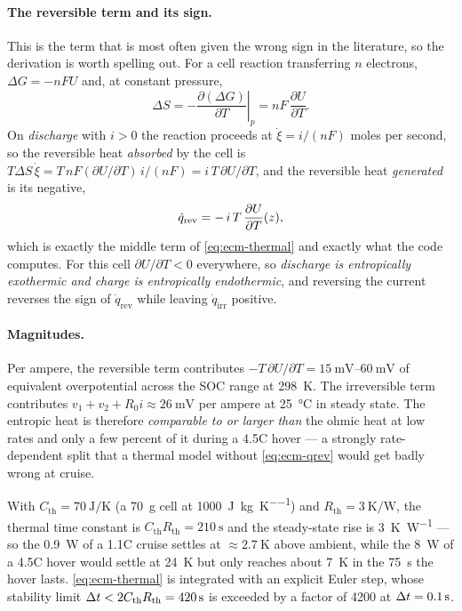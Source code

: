 \paragraph{The reversible term and its sign.} This is the term that is most often given the wrong
sign in the literature, so the derivation is worth spelling out. For a cell reaction transferring
$n$ electrons, $\Delta G = -nFU$ and, at constant pressure,
\begin{equation}
\Delta S = -\left.\frac{\partial(\Delta G)}{\partial T}\right|_p = nF\,\frac{\partial U}{\partial T}.
\label{eq:ecm-deltaS}
\end{equation}
On \emph{discharge} with $i>0$ the reaction proceeds at $\dot{\xi} = i/(nF)$ moles per second, so
the reversible heat \emph{absorbed} by the cell is
$T\Delta S\,\dot\xi = T\,nF(\partial U/\partial T)\,i/(nF) = i\,T\,\partial U/\partial T$, and the
reversible heat \emph{generated} is its negative,
\begin{equation}
\dot{q}_{\mathrm{rev}} = -\,i\,T\,\frac{\partial U}{\partial T}(z),
\label{eq:ecm-qrev}
\end{equation}
which is exactly the middle term of \eqref{eq:ecm-thermal} and exactly what the code computes.
For this cell $\partial U/\partial T<0$ everywhere, so \emph{discharge is entropically exothermic
and charge is entropically endothermic}, and reversing the current reverses the sign of
$\dot q_{\mathrm{rev}}$ while leaving $\dot q_{\mathrm{irr}}$ positive.

\paragraph{Magnitudes.} Per ampere, the reversible term contributes
$-T\,\partial U/\partial T = \SIrange{15}{60}{\milli\volt}$ of equivalent overpotential across the
SOC range at \SI{298}{\kelvin}. The irreversible term contributes
$v_1+v_2+R_0 i \approx \SI{26}{\milli\volt}$ per ampere at \SI{25}{\celsius} in steady state.
The entropic heat is therefore \emph{comparable to or larger than} the ohmic heat at low rates
and only a few percent of it during a 4.5C hover --- a strongly rate-dependent split that a
thermal model without \eqref{eq:ecm-qrev} would get badly wrong at cruise.

With $C_{\mathrm{th}} = \SI{70}{\joule\per\kelvin}$ (a \SI{70}{\gram} cell at
\SI{1000}{\joule\per\kilogram\per\kelvin}) and
$R_{\mathrm{th}} = \SI{3}{\kelvin\per\watt}$, the thermal time constant is
$C_{\mathrm{th}}R_{\mathrm{th}} = \SI{210}{\second}$ and the steady-state rise is
\SI{3}{\kelvin\per\watt} --- so the \SI{0.9}{\watt} of a 1.1C cruise settles at
$\approx\SI{2.7}{\kelvin}$ above ambient, while the \SI{8}{\watt} of a 4.5C hover would settle at
\SI{24}{\kelvin} but only reaches about \SI{7}{\kelvin} in the \SI{75}{\second} the hover lasts.
\eqref{eq:ecm-thermal} is integrated with an explicit Euler step, whose stability limit
$\Delta t < 2C_{\mathrm{th}}R_{\mathrm{th}} = \SI{420}{\second}$ is exceeded by a factor of
\num{4200} at $\Delta t=\SI{0.1}{\second}$.

